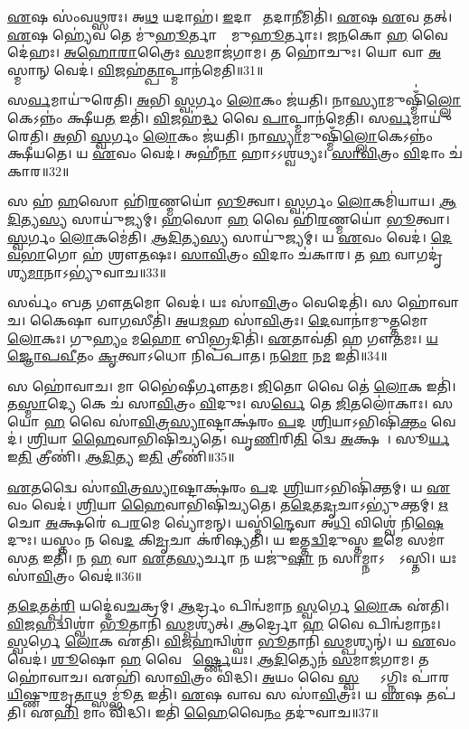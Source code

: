    \ul{𑌏}𑌷 𑌸𑌂॑𑌵\ul{𑌥𑍍𑌸}𑌰𑌃।
   𑌅\ul{𑌥} 𑌯𑌦𑌾𑌹॑।
   \ul{𑌇}𑌦𑌾𑌨𑍀𑌂᳚ \ul{𑌤}𑌦𑌾\ul{𑌨𑍀}𑌮𑌿𑌤𑌿॑।
   \ul{𑌏}𑌷 \ul{𑌏}𑌵 𑌤𑌤𑍍।
   \ul{𑌏}𑌷 𑌹𑍍𑌯𑍇॑𑌵 𑌤𑍇 𑌮𑍁॑\ul{𑌹𑍂}𑌰𑍍𑌤𑌾𑌨𑌾𑌂᳚ 𑌮𑍁\ul{𑌹𑍂}𑌰𑍍𑌤𑌾𑌃।
    \ul{𑌜}\ul{𑌨}𑌕𑍋 \ul{𑌹} 𑌵𑍈𑌦𑍇॑𑌹𑌃।
   \ul{𑌅}\ul{𑌹𑍋}\ul{𑌰𑌾}𑌤𑍍𑌰𑍈𑌃 \ul{𑌸}𑌮𑌾𑌜॑𑌗𑌾𑌮।
   𑌤 𑌹𑍋॑𑌚𑍁𑌃।
   𑌯𑍋 𑌵𑌾 \ul{𑌅}𑌸𑍍𑌮𑌾𑌨𑍍 𑌵𑍇𑌦॑।
   \ul{𑌵𑌿}𑌜𑌹॑\ul{𑌤𑍍𑌪𑌾}𑌪𑍍𑌮𑌾𑌨॑𑌮𑍇𑌤𑌿॥31॥

   𑌸\ul{𑌰𑍍𑌵}𑌮𑌾𑌯𑍁॑𑌰𑍇𑌤𑌿।
   \ul{𑌅}𑌭𑌿 \ul{𑌸𑍍𑌵}𑌰𑍍𑌗𑌂 \ul{𑌲𑍋}𑌕𑌂 𑌜॑𑌯𑌤𑌿।
   𑌨𑌾\ul{𑌸𑍍𑌯𑌾}𑌮𑍁𑌷𑍍𑌮𑌿𑌁॑\ul{𑌲𑍍𑌲𑍋}𑌕𑍇\-𑌽𑌨𑍍𑌨𑌂॑ 𑌕𑍍𑌷𑍀𑌯\ul{𑌤} 𑌇𑌤𑌿॑।
   \ul{𑌵𑌿}𑌜𑌹॑\ul{𑌦𑍍𑌧} 𑌵𑍈 \ul{𑌪𑌾}𑌪𑍍𑌮𑌾𑌨॑𑌮𑍇𑌤𑌿।
   𑌸\ul{𑌰𑍍𑌵}𑌮𑌾𑌯𑍁॑𑌰𑍇𑌤𑌿।
   \ul{𑌅}𑌭𑌿 \ul{𑌸𑍍𑌵}𑌰𑍍𑌗𑌂 \ul{𑌲𑍋}𑌕𑌂 𑌜॑𑌯𑌤𑌿।
   𑌨𑌾\ul{𑌸𑍍𑌯𑌾}𑌮𑍁𑌷𑍍𑌮𑌿𑌁॑\ul{𑌲𑍍𑌲𑍋}𑌕𑍇𑌽𑌨𑍍𑌨𑌂॑ 𑌕𑍍𑌷𑍀𑌯𑌤𑍇।
   𑌯 \ul{𑌏}𑌵𑌂 𑌵𑍇𑌦॑।
   𑌅𑌹𑍀॑\ul{𑌨𑌾} 𑌹𑌾𑌽𑌽𑌶𑍍𑌵॑𑌥𑍍𑌯𑌃।
   \ul{𑌸𑌾}\ul{𑌵𑌿}𑌤𑍍𑌰𑌂 \ul{𑌵𑌿}𑌦𑌾𑌂 𑌚॑𑌕𑌾𑌰॥32॥

   𑌸 𑌹॑ \ul{𑌹}\ul{}𑌸𑍋 𑌹𑌿॑\ul{𑌰}𑌣𑍍𑌮𑌯𑍋॑ \ul{𑌭𑍂}𑌤𑍍𑌵𑌾।
   \ul{𑌸𑍍𑌵}𑌰𑍍𑌗𑌂 \ul{𑌲𑍋}𑌕𑌮𑌿॑𑌯𑌾𑌯।
   \ul{𑌆}\ul{𑌦𑌿}𑌤𑍍𑌯\ul{𑌸𑍍𑌯} 𑌸𑌾𑌯𑍁॑𑌜𑍍𑌯𑌮𑍍।
   \ul{𑌹}\ul{}𑌸𑍋 \ul{𑌹} 𑌵𑍈 𑌹𑌿॑\ul{𑌰}𑌣𑍍𑌮𑌯𑍋॑ \ul{𑌭𑍂}𑌤𑍍𑌵𑌾।
   \ul{𑌸𑍍𑌵}𑌰𑍍𑌗𑌂 \ul{𑌲𑍋}𑌕𑌮𑍇॑𑌤𑌿।
   \ul{𑌆}\ul{𑌦𑌿}𑌤𑍍𑌯\ul{𑌸𑍍𑌯} 𑌸𑌾𑌯𑍁॑𑌜𑍍𑌯𑌮𑍍।
   𑌯 \ul{𑌏}𑌵𑌂 𑌵𑍇𑌦॑।
   \ul{𑌦𑍇}\ul{𑌵}\ul{𑌭𑌾}𑌗𑍋 𑌹॑ 𑌶𑍍𑌰𑍗\ul{𑌤}𑌷𑌃।
   \ul{𑌸𑌾}\ul{𑌵𑌿}𑌤𑍍𑌰𑌂 \ul{𑌵𑌿}𑌦𑌾𑌂 𑌚॑𑌕𑌾𑌰।
   𑌤 \ul{𑌹} 𑌵𑌾𑌗𑌦𑍃॑𑌶𑍍𑌯\ul{𑌮𑌾}𑌨𑌾𑌽𑌭𑍍𑌯𑍁॑𑌵𑌾𑌚॥33॥

   𑌸𑌰𑍍𑌵𑌂॑ 𑌬𑌤 𑌗𑍗\ul{𑌤}𑌮𑍋 𑌵𑍇𑌦॑।
   𑌯𑌃 𑌸𑌾॑\ul{𑌵𑌿}𑌤𑍍𑌰𑌂 𑌵𑍇𑌦𑍇𑌤𑌿॑।
   𑌸 𑌹𑍋॑𑌵𑌾𑌚।
   𑌕𑍈𑌷𑌾 𑌵𑌾\ul{𑌗}𑌸𑍀𑌤𑌿॑।
   \ul{𑌅}𑌯\ul{𑌮}𑌹 𑌸𑌾॑\ul{𑌵𑌿}𑌤𑍍𑌰𑌃।
   \ul{𑌦𑍇}𑌵𑌾𑌨𑌾॑𑌮𑍁\ul{𑌤𑍍𑌤}𑌮𑍋 \ul{𑌲𑍋}𑌕𑌃।
   𑌗𑍁\ul{𑌹𑍍𑌯𑌂} 𑌮\ul{𑌹𑍋} 𑌬𑌿\ul{𑌭𑍍𑌰}𑌦𑌿𑌤𑌿॑।
   \ul{𑌏}𑌤𑌾𑌵॑𑌤𑌿 𑌹 𑌗𑍗\ul{𑌤}𑌮𑌃।
   \ul{𑌯}\ul{𑌜𑍍𑌞𑍋}\ul{𑌪}\ul{𑌵𑍀}𑌤𑌂 \ul{𑌕𑍃}𑌤𑍍𑌵𑌾𑌽𑌧𑍋 𑌨𑌿𑌪॑𑌪𑌾𑌤।
   𑌨\ul{𑌮𑍋} 𑌨\ul{𑌮} 𑌇𑌤𑌿॑॥34॥

   𑌸 𑌹𑍋॑𑌵𑌾𑌚।
   𑌮𑌾 𑌭𑍈॑𑌷𑍀𑌰𑍍𑌗𑍗𑌤𑌮।
   \ul{𑌜𑌿}𑌤𑍋 𑌵𑍈 𑌤𑍇॑ \ul{𑌲𑍋}𑌕 𑌇𑌤𑌿॑।
   𑌤\ul{𑌸𑍍𑌮𑌾}𑌦𑍍𑌯𑍇 𑌕𑍇 𑌚॑ 𑌸𑌾\ul{𑌵𑌿}𑌤𑍍𑌰𑌂 \ul{𑌵𑌿}𑌦𑍁𑌃।
   𑌸\ul{𑌰𑍍𑌵𑍇} 𑌤𑍇 \ul{𑌜𑌿}𑌤𑌲𑍋॑𑌕𑌾𑌃।
   𑌸 𑌯𑍋 \ul{𑌹} 𑌵𑍈 𑌸𑌾॑\ul{𑌵𑌿}𑌤𑍍𑌰\ul{𑌸𑍍𑌯𑌾}𑌷𑍍𑌟𑌾𑌕𑍍𑌷॑𑌰𑌂 \ul{𑌪}𑌦 \ul{𑌶𑍍𑌰𑌿}𑌯𑌾𑌽𑌭𑌿𑌷𑌿॑\ul{𑌕𑍍𑌤𑌂} 𑌵𑍇𑌦॑।
   \ul{𑌶𑍍𑌰𑌿}𑌯𑌾 \ul{𑌹𑍈}𑌵𑌾𑌭𑌿𑌷𑌿॑𑌚𑍍𑌯𑌤𑍇।
   𑌘𑍃\ul{𑌣𑌿}𑌰𑌿\ul{𑌤𑌿} 𑌦𑍍𑌵𑍇 \ul{𑌅}𑌕𑍍𑌷𑌰𑍇᳚।
   𑌸𑍂\ul{𑌰𑍍𑌯} 𑌇\ul{𑌤𑌿} 𑌤𑍍𑌰𑍀𑌣𑌿॑।
   \ul{𑌆}\ul{𑌦𑌿}𑌤𑍍𑌯 𑌇\ul{𑌤𑌿} 𑌤𑍍𑌰𑍀𑌣𑌿॑॥35॥

   \ul{𑌏}𑌤𑌦𑍍𑌵𑍈 𑌸𑌾॑\ul{𑌵𑌿}𑌤𑍍𑌰\ul{𑌸𑍍𑌯𑌾}𑌷𑍍𑌟𑌾𑌕𑍍𑌷॑𑌰𑌂 \ul{𑌪}𑌦 \ul{𑌶𑍍𑌰𑌿}𑌯𑌾𑌽𑌭𑌿𑌷𑌿॑𑌕𑍍𑌤𑌮𑍍।
   𑌯 \ul{𑌏}𑌵𑌂 𑌵𑍇𑌦॑।
   \ul{𑌶𑍍𑌰𑌿}𑌯𑌾 \ul{𑌹𑍈}𑌵𑌾𑌭𑌿𑌷𑌿॑𑌚𑍍𑌯𑌤𑍇।
   𑌤\ul{𑌦𑍇}𑌤\ul{𑌦𑍃}𑌚𑌾𑌽𑌭𑍍𑌯𑍁॑𑌕𑍍𑌤𑌮𑍍।
   \ul{𑌋}𑌚𑍋 \ul{𑌅}𑌕𑍍𑌷𑌰𑍇॑ 𑌪\ul{𑌰}𑌮𑍇 𑌵𑍍𑌯𑍋॑𑌮𑌨𑍍।
   𑌯𑌸𑍍𑌮𑌿॑\ul{𑌨𑍍𑌦𑍇}𑌵𑌾 𑌅\ul{𑌧𑌿} 𑌵𑌿𑌶𑍍𑌵𑍇॑ 𑌨𑌿\ul{𑌷𑍇}𑌦𑍁𑌃।
   𑌯𑌸𑍍𑌤𑌂 𑌨 𑌵𑍇\ul{𑌦} 𑌕𑌿\ul{𑌮𑍃}𑌚𑌾 𑌕॑𑌰𑌿𑌷𑍍𑌯𑌤𑌿।
   𑌯 𑌇𑌤𑍍𑌤\ul{𑌦𑍍𑌵𑌿}𑌦𑍁𑌸𑍍𑌤 \ul{𑌇}𑌮𑍇 𑌸𑌮𑌾॑𑌸\ul{𑌤} 𑌇𑌤𑌿॑।
   𑌨 \ul{𑌹} 𑌵𑌾 \ul{𑌏}𑌤\ul{𑌸𑍍𑌯}𑌰𑍍𑌚𑌾 𑌨 𑌯𑌜𑍁॑\ul{𑌷𑌾} 𑌨 𑌸𑌾𑌮𑍍𑌨𑌾𑌽𑌰𑍍𑌥𑍋᳚𑌽𑌸𑍍𑌤𑌿।
   𑌯𑌃 𑌸𑌾॑\ul{𑌵𑌿}𑌤𑍍𑌰𑌂 𑌵𑍇𑌦॑॥36॥

   𑌤\ul{𑌦𑍇}𑌤𑌤𑍍𑌪॑\ul{𑌰𑌿} 𑌯𑌦𑍍𑌦𑍇॑𑌵\ul{𑌚}𑌕𑍍𑌰𑌮𑍍।
   \ul{𑌆}𑌰𑍍𑌦𑍍𑌰𑌂 𑌪𑌿𑌨𑍍𑌵॑𑌮𑌾𑌨 \ul{𑌸𑍍𑌵}𑌰𑍍𑌗𑍇 \ul{𑌲𑍋}𑌕 𑌏॑𑌤𑌿।
   \ul{𑌵𑌿}𑌜\ul{𑌹}𑌦𑍍𑌵𑌿𑌶𑍍𑌵𑌾॑ \ul{𑌭𑍂}𑌤𑌾𑌨𑌿॑ \ul{𑌸}𑌮𑍍𑌪𑌶𑍍𑌯॑𑌤𑍍।
   \ul{𑌆}𑌰𑍍𑌦𑍍𑌰𑍋 \ul{𑌹} 𑌵𑍈 𑌪𑌿𑌨𑍍𑌵॑𑌮𑌾𑌨𑌃।
   \ul{𑌸𑍍𑌵}𑌰𑍍𑌗𑍇 \ul{𑌲𑍋}𑌕 𑌏॑𑌤𑌿।
   \ul{𑌵𑌿}𑌜\ul{𑌹}𑌨𑍍𑌵𑌿𑌶𑍍𑌵𑌾॑ \ul{𑌭𑍂}𑌤𑌾𑌨𑌿॑ \ul{𑌸}𑌮𑍍𑌪𑌶𑍍𑌯𑌨𑍍॑।
   𑌯 \ul{𑌏}𑌵𑌂 𑌵𑍇𑌦॑।
   \ul{𑌶𑍂}𑌷𑍋 \ul{𑌹} 𑌵𑍈 𑌵𑌾᳚\ul{𑌰𑍍𑌷𑍍𑌣𑍇}𑌯𑌃।
   \ul{𑌆}\ul{𑌦𑌿}𑌤𑍍𑌯𑍇𑌨॑ \ul{𑌸}𑌮𑌾𑌜॑𑌗𑌾𑌮।
   𑌤 𑌹𑍋॑𑌵𑌾𑌚।
   𑌏𑌹𑌿॑ 𑌸𑌾\ul{𑌵𑌿}𑌤𑍍𑌰𑌂 𑌵𑌿॑𑌦𑍍𑌧𑌿।
   \ul{𑌅}𑌯𑌂 𑌵𑍈 \ul{𑌸𑍍𑌵}𑌰𑍍𑌗𑍍𑌯𑍋᳚𑌽𑌗𑍍𑌨𑌿𑌃 𑌪𑌾॑𑌰\ul{𑌯𑌿}𑌷𑍍𑌣𑍁\ul{𑌰}𑌮𑍃\ul{𑌤𑌾}𑌥𑍍𑌸𑌮𑍍𑌭𑍂॑\ul{𑌤} 𑌇𑌤𑌿॑।
   \ul{𑌏}𑌷 𑌵𑌾𑌵 𑌸 𑌸𑌾॑\ul{𑌵𑌿}𑌤𑍍𑌰𑌃।
   𑌯 \ul{𑌏}𑌷 𑌤𑌪॑𑌤𑌿।
   𑌏\ul{𑌹𑌿} 𑌮𑌾𑌂 𑌵𑌿॑𑌦𑍍𑌧𑌿।
   𑌇𑌤𑌿॑ \ul{𑌹𑍈}𑌵𑍈\ul{𑌨𑌂} 𑌤𑌦𑍁॑𑌵𑌾𑌚॥37॥
   \anuvakamend

